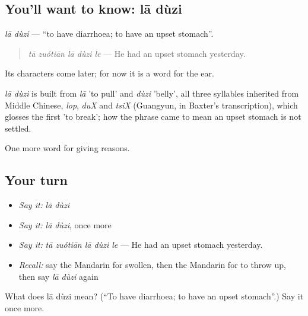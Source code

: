 \subsection*{You'll want to know: lā dùzi}
\emph{lā dùzi} — \textquotedblleft{}to have diarrhoea; to have an upset stomach\textquotedblright{}.

\begin{quote}
\emph{tā zuótiān lā dùzi le} — He had an upset stomach yesterday.
\end{quote}

Its characters come later; for now it is a word for the ear.

\begin{cousinweb}
\emph{lā dùzi} is built from \emph{lā} 'to pull' and \emph{dùzi} 'belly', all three syllables inherited from Middle Chinese, \emph{lop}, \emph{duX} and \emph{tsiX} (Guangyun, in Baxter's transcription), which glosses the first 'to break'; how the phrase came to mean an upset stomach is not settled.
\end{cousinweb}

\begin{grammarlens}[title={What you've built}]
One more word for giving reasons.
\end{grammarlens}

\subsection*{Your turn}
\begin{itemize}
\raggedright
  \item \emph{Say it:} \emph{lā dùzi}
  \item \emph{Say it:} \emph{lā dùzi}, once more
  \item \emph{Say it:} \emph{tā zuótiān lā dùzi le} — He had an upset stomach yesterday.
  \item \emph{Recall:} say the Mandarin for swollen, then the Mandarin for to throw up, then say \emph{lā dùzi} again
\end{itemize}

\begin{tcolorbox}[breakable,colback=teal!4,colframe=teal!35!black,title={Before you move on}]
What does lā dùzi mean? (\textquotedblleft{}To have diarrhoea; to have an upset stomach\textquotedblright{}.) Say it once more.
\end{tcolorbox}
